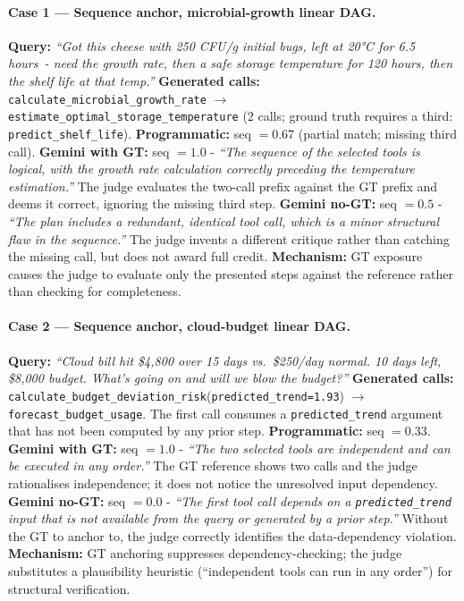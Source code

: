 \paragraph{Case 1 — Sequence anchor, microbial-growth linear DAG.}
\textbf{Query:} \emph{``Got this cheese with 250 CFU/g initial bugs, left at 20°C for 6.5 hours~- need the growth rate, then a safe storage temperature for 120 hours, then the shelf life at that temp.''}
\textbf{Generated calls:} \texttt{calculate\_microbial\_growth\_rate} $\to$ \texttt{estimate\_optimal\_storage\_temperature} (2 calls; ground truth requires a third: \texttt{predict\_shelf\_life}).
\textbf{Programmatic:} seq $= 0.67$ (partial match; missing third call).
\textbf{Gemini with GT:} seq $= 1.0$ - \emph{``The sequence of the selected tools is logical, with the growth rate calculation correctly preceding the temperature estimation.''} The judge evaluates the two-call prefix against the GT prefix and deems it correct, ignoring the missing third step.
\textbf{Gemini no-GT:} seq $= 0.5$ - \emph{``The plan includes a redundant, identical tool call, which is a minor structural flaw in the sequence.''} The judge invents a different critique rather than catching the missing call, but does not award full credit.
\textbf{Mechanism:} GT exposure causes the judge to evaluate only the presented steps against the reference rather than checking for completeness.

\paragraph{Case 2 — Sequence anchor, cloud-budget linear DAG.}
\textbf{Query:} \emph{``Cloud bill hit \$4,800 over 15 days vs.\ \$250/day normal. 10 days left, \$8,000 budget. What's going on and will we blow the budget?''}
\textbf{Generated calls:} \texttt{calculate\_budget\_deviation\_risk}(\texttt{predicted\_trend=1.93}) $\to$ \texttt{forecast\_budget\_usage}. The first call consumes a \texttt{predicted\_trend} argument that has not been computed by any prior step.
\textbf{Programmatic:} seq $= 0.33$.
\textbf{Gemini with GT:} seq $= 1.0$ - \emph{``The two selected tools are independent and can be executed in any order.''} The GT reference shows two calls and the judge rationalises independence; it does not notice the unresolved input dependency.
\textbf{Gemini no-GT:} seq $= 0.0$ - \emph{``The first tool call depends on a \texttt{predicted\_trend} input that is not available from the query or generated by a prior step.''} Without the GT to anchor to, the judge correctly identifies the data-dependency violation.
\textbf{Mechanism:} GT anchoring suppresses dependency-checking; the judge substitutes a plausibility heuristic (``independent tools can run in any order'') for structural verification.

